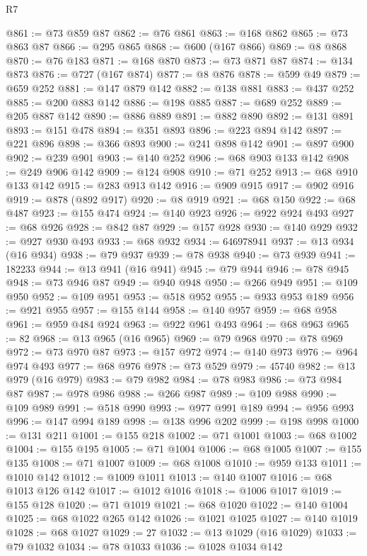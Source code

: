 \begin{lexlean}{R7}
\begin{coremodule}
@861 := @73 @859 @87
@862 := @76 @861
@863 := @168 @862
@865 := @73 @863 @87
@866 := @295 @865
@868 := @600 (@167 @866)
@869 := @8 @868
@870 := @76 @183
@871 := @168 @870
@873 := @73 @871 @87
@874 := @134 @873
@876 := @727 (@167 @874)
@877 := @8 @876
@878 := @599 @49
@879 := @659 @252
@881 := @147 @879 @142
@882 := @138 @881
@883 := @437 @252
@885 := @200 @883 @142
@886 := @198 @885
@887 := @689 @252
@889 := @205 @887 @142
@890 := @886 @889
@891 := @882 @890
@892 := @131 @891
@893 := @151 @478
@894 := @351 @893
@896 := @223 @894 @142
@897 := @221 @896
@898 := @366 @893
@900 := @241 @898 @142
@901 := @897 @900
@902 := @239 @901
@903 := @140 @252
@906 := @68 @903 @133 @142
@908 := @249 @906 @142
@909 := @124 @908
@910 := @71 @252
@913 := @68 @910 @133 @142
@915 := @283 @913 @142
@916 := @909 @915
@917 := @902 @916
@919 := @878 (@892 @917)
@920 := @8 @919
@921 := @68 @150
@922 := @68 @487
@923 := @155 @474
@924 := @140 @923
@926 := @922 @924 @493
@927 := @68 @926
@928 := @842 @87
@929 := @157 @928
@930 := @140 @929
@932 := @927 @930 @493
@933 := @68 @932
@934 := 646978941
@937 := @13 @934 (@16 @934)
@938 := @79 @937
@939 := @78 @938
@940 := @73 @939
@941 := 182233
@944 := @13 @941 (@16 @941)
@945 := @79 @944
@946 := @78 @945
@948 := @73 @946 @87
@949 := @940 @948
@950 := @266 @949
@951 := @109 @950
@952 := @109 @951
@953 := @518 @952
@955 := @933 @953 @189
@956 := @921 @955
@957 := @155 @144
@958 := @140 @957
@959 := @68 @958
@961 := @959 @484 @924
@963 := @922 @961 @493
@964 := @68 @963
@965 := 82
@968 := @13 @965 (@16 @965)
@969 := @79 @968
@970 := @78 @969
@972 := @73 @970 @87
@973 := @157 @972
@974 := @140 @973
@976 := @964 @974 @493
@977 := @68 @976
@978 := @73 @529
@979 := 45740
@982 := @13 @979 (@16 @979)
@983 := @79 @982
@984 := @78 @983
@986 := @73 @984 @87
@987 := @978 @986
@988 := @266 @987
@989 := @109 @988
@990 := @109 @989
@991 := @518 @990
@993 := @977 @991 @189
@994 := @956 @993
@996 := @147 @994 @189
@998 := @138 @996 @202
@999 := @198 @998
@1000 := @131 @211
@1001 := @155 @218
@1002 := @71 @1001
@1003 := @68 @1002
@1004 := @155 @195
@1005 := @71 @1004
@1006 := @68 @1005
@1007 := @155 @135
@1008 := @71 @1007
@1009 := @68 @1008
@1010 := @959 @133
@1011 := @1010 @142
@1012 := @1009 @1011
@1013 := @140 @1007
@1016 := @68 @1013 @126 @142
@1017 := @1012 @1016
@1018 := @1006 @1017
@1019 := @155 @128
@1020 := @71 @1019
@1021 := @68 @1020
@1022 := @140 @1004
@1025 := @68 @1022 @265 @142
@1026 := @1021 @1025
@1027 := @140 @1019
@1028 := @68 @1027
@1029 := 27
@1032 := @13 @1029 (@16 @1029)
@1033 := @79 @1032
@1034 := @78 @1033
@1036 := @1028 @1034 @142

\end{coremodule}
\end{lexlean}
